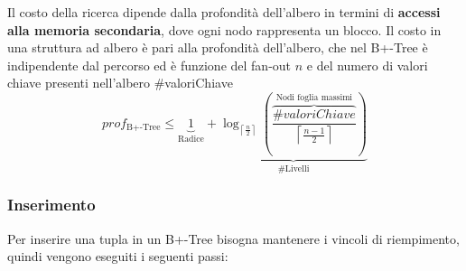 \documentclass[a4paper,twoside]{article}
\begin{document}
\vspace{1em}
\noindent
Il costo della ricerca dipende dalla profondità dell'albero in termini di
\textbf{accessi alla memoria secondaria}, dove ogni nodo rappresenta un blocco. 
Il costo in una struttura ad albero è pari alla profondità dell'albero, che nel
B+-Tree è indipendente dal percorso ed è funzione del fan-out \( n \) e del numero
di valori chiave presenti nell'albero \#valoriChiave
\[
  prof_{\text{B+-Tree}} \le \underbrace{1}_{\text{Radice}} + 
  \underbrace{\log_{\left\lceil \frac{n}{2} \right\rceil} \left( 
      \overbrace{\frac{\#valoriChiave}{\left\lceil \frac{n-1}{2} \right\rceil }}^{\text{Nodi foglia massimi}}
  \right)}_{\text{\# Livelli}}
\] 

\subsubsection*{Inserimento}
Per inserire una tupla in un B+-Tree bisogna mantenere i vincoli di riempimento, quindi
vengono eseguiti i seguenti passi:
\end{document}
